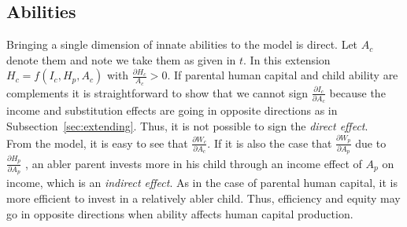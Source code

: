 \subsection{Abilities}

\noindent Bringing a single dimension of innate abilities to the model is direct. Let $A_{c}$ denote them and note we take them as given in $t$. In this extension $H_{c} = f (I_{c}, H_{p}, A_{c})$ with $\frac{\partial H_{c}}{ A_{c}} > 0$. If parental human capital and child ability are complements it is straightforward  to show that we cannot sign $\frac{\partial I_{c}}{\partial A_{c}}$ because the income and substitution effects are going in opposite directions as in Subsection~\ref{sec:extending}. Thus, it is not possible to sign the \textit{direct effect}. \\
\indent From the model, it is easy to see that $\frac{\partial W_{c}}{\partial A_{c}}$.  If it is also the case that $\frac{\partial W_{p}}{\partial A_{p}}$ due to $\frac{\partial H_{p}}{\partial A_{p}}$  , an abler parent invests more in his child through an income effect of $A_{p}$ on income, which is an \textit{indirect effect}. As in the case of parental human capital, it is more efficient to invest in a relatively abler child. Thus, efficiency and equity may go in opposite directions when ability affects human capital production. 

